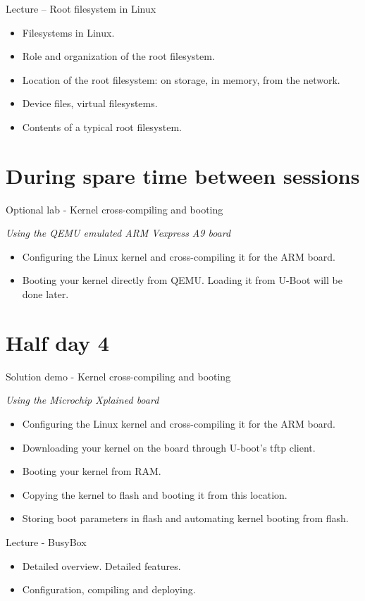\documentclass[a4paper,12pt,obeyspaces,spaces,hyphens]{article}
\begin{document}
\feagendaonecolumn
{Lecture – Root filesystem in Linux}
{
  \begin{itemize}
  \item Filesystems in Linux.
  \item Role and organization of the root filesystem.
  \item Location of the root filesystem: on storage, in memory,
        from the network.
  \item Device files, virtual filesystems.
  \item Contents of a typical root filesystem.
  \end{itemize}
}

\section{During spare time between sessions}

\feagendaonecolumn
{Optional lab - Kernel cross-compiling and booting}
{
  {\em Using the QEMU emulated ARM Vexpress A9 board}
  \begin{itemize}
  \item Configuring the Linux kernel and cross-compiling it for the ARM board.
  \item Booting your kernel directly from QEMU. Loading it from U-Boot
        will be done later.
  \end{itemize}
}

\section{Half day 4}

\feagendaonecolumn
{Solution demo - Kernel cross-compiling and booting}
{
  {\em Using the Microchip Xplained board}
  \begin{itemize}
  \item Configuring the Linux kernel and cross-compiling it for the ARM board.
  \item Downloading your kernel on the board through U-boot's tftp client.
  \item Booting your kernel from RAM.
  \item Copying the kernel to flash and booting it from this location.
  \item Storing boot parameters in flash and automating kernel booting from flash.
  \end{itemize}
}

\feagendaonecolumn
{Lecture - BusyBox}
{
  \begin{itemize}
  \item Detailed overview. Detailed features.
  \item Configuration, compiling and deploying.
  \end{itemize}
}
\end{document}
